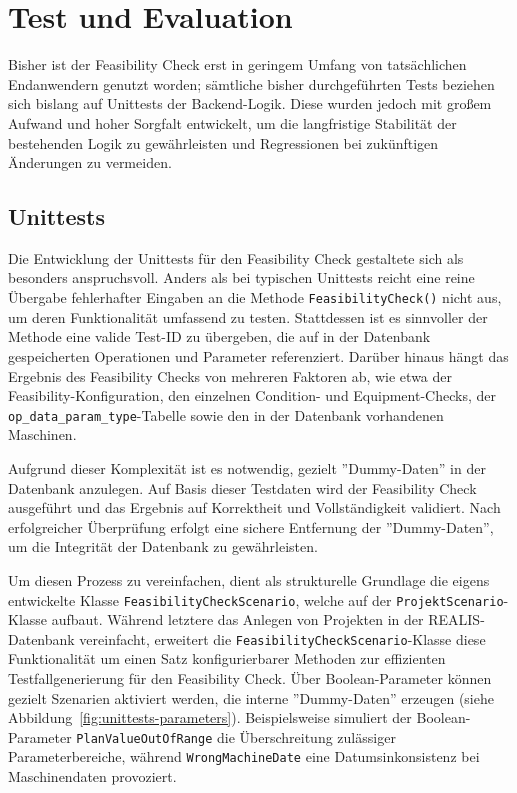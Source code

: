 \chapter{Test und Evaluation}

Bisher ist der Feasibility Check erst in geringem Umfang von tatsächlichen Endanwendern genutzt worden; sämtliche bisher durchgeführten Tests beziehen sich bislang auf Unittests der Backend-Logik. Diese wurden jedoch mit großem Aufwand und hoher Sorgfalt entwickelt, um die langfristige Stabilität der bestehenden Logik zu gewährleisten und Regressionen bei zukünftigen Änderungen zu vermeiden.

\section{Unittests}

Die Entwicklung der Unittests für den Feasibility Check gestaltete sich als besonders anspruchsvoll. Anders als bei typischen Unittests reicht eine reine Übergabe fehlerhafter Eingaben an die Methode \texttt{FeasibilityCheck()} nicht aus, um deren Funktionalität umfassend zu testen. Stattdessen ist es sinnvoller der Methode eine valide Test-ID zu übergeben, die auf in der Datenbank gespeicherten Operationen und Parameter referenziert. Darüber hinaus hängt das Ergebnis des Feasibility Checks von mehreren Faktoren ab, wie etwa der Feasibility-Konfiguration, den einzelnen Condition- und Equipment-Checks, der \texttt{op\_data\_param\_type}-Tabelle sowie den in der Datenbank vorhandenen Maschinen.

Aufgrund dieser Komplexität ist es notwendig, gezielt ''Dummy-Daten'' in der Datenbank anzulegen. Auf Basis dieser Testdaten wird der Feasibility Check ausgeführt und das Ergebnis auf Korrektheit und Vollständigkeit validiert. Nach erfolgreicher Überprüfung erfolgt eine sichere Entfernung der ''Dummy-Daten'', um die Integrität der Datenbank zu gewährleisten.

Um diesen Prozess zu vereinfachen, dient als strukturelle Grundlage die eigens entwickelte Klasse \texttt{FeasibilityCheckScenario}, welche auf der \texttt{ProjektScenario}-Klasse aufbaut. Während letztere das Anlegen von Projekten in der REALIS-Daten\-bank vereinfacht, erweitert die \texttt{FeasibilityCheckScenario}-Klasse diese Funktionalität um einen Satz konfigurierbarer Methoden zur effizienten Testfallgenerierung für den Feasibility Check. Über Boolean-Parameter können gezielt Szenarien aktiviert werden, die interne ''Dummy-Daten'' erzeugen (siehe Abbildung~\ref{fig:unittests-parameters}). Beispielsweise simuliert der Boolean-Parameter \texttt{PlanValueOutOfRange} die Überschreitung zulässiger Parameterbereiche, während \texttt{WrongMachineDate} eine Datumsinkonsistenz bei Maschinendaten provoziert.

